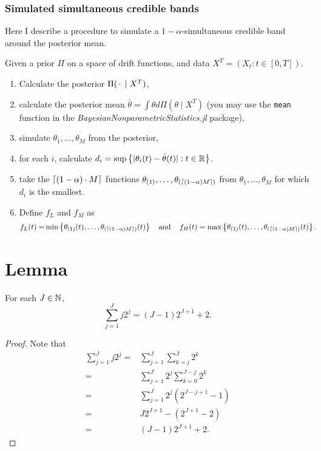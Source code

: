 \documentclass[12pt]{article}
\begin{document}
\subsubsection{Simulated simultaneous credible bands}

Here I describe a procedure to simulate a $1-\alpha$-simultaneous credible band around the posterior mean. 

\begin{algorithm}
    Given a prior $\Pi$ on a space of drift functions, and data $X^T=(X_t:t\in[0,T])$. 
    \begin{enumerate}
        \item Calculate the posterior $\Pi(\operatorname{\,\cdot\,}\mid X^T)$,
        \item calculate the posterior mean $\bar \theta= \int \theta d\Pi(\theta \mid X^T)$ (you may use the \verb|mean| function in the \textit{BayesianNonparametricStatistics.jl} package),
        \item simulate $\theta_1,\ldots,\theta_M$ from the posterior, 
        \item for each $i$, calculate $d_i=\sup\left\{ |\theta_i(t)-\bar \theta(t)|:t\in \operatorname{\mathbb{R}} \right\}$.
        \item take the  $\left\lceil (1-\alpha)\cdot M \right\rceil$ functions $\theta_{(1)},\ldots, \theta_{(\left\lceil (1-\alpha)M \right\rceil)}$ from $\theta_1,\ldots,\theta_M$ for which $d_i$ is the smallest. 
        \item Define $f_L$ and $f_M$ as 
        \begin{align*}
        f_L(t)=& \min\left\{ \theta_{(1)}(t), \ldots, \theta_{(\left\lceil (1-\alpha)M \right\rceil)}(t) \right\}
        \operatorname{\quad\text{and}\quad} f_H(t)= \max\left\{ \theta_{(1)}(t), \ldots, \theta_{(\left\lceil (1-\alpha)M \right\rceil)}(t) \right\}.
        \end{align*}
    \end{enumerate}
\end{algorithm}

\appendix

\section{Lemma}

\begin{lemma}\label{lem:sumjtwotothepowerj}
   For each $J\in \operatorname{\mathbb{N}}$,  \[
    \sum_{j=1}^Jj2^j=(J-1)2^{J+1} + 2. 
    \]
\end{lemma}
\begin{proof}
    Note that 
    \begin{align*}
    \sum_{j=1}^J j2^j =&\sum_{j=1}^J \sum_{k=j}^J2^k\\
    = & \sum_{j=1}^J 2^j\sum_{k=0}^{J-j}2^k \\
    = & \sum_{j=1}^J 2^j (2^{J-j+1}-1)\\
    = & J2^{J+1} - (2^{J+1}-2)\\  
    = & (J-1)2^{J+1} + 2.
\end{align*}

\end{proof}
\end{document}
